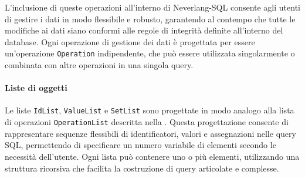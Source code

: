 \documentclass[12pt,a4paper,openright,twoside]{book}
\begin{document}
L’inclusione di queste operazioni all’interno di Neverlang-SQL consente agli utenti di gestire i dati in modo flessibile e robusto, 
garantendo al contempo che tutte le modifiche ai dati siano conformi alle regole di integrità definite all’interno del database. 
Ogni operazione di gestione dei dati è progettata per essere un’operazione \texttt{Operation} indipendente, che può essere 
utilizzata singolarmente o combinata con altre operazioni in una singola query.

\paragraph{Liste di oggetti}
Le liste \texttt{IdList}, \texttt{ValueList} e \texttt{SetList} sono progettate in modo analogo alla lista di operazioni 
\texttt{OperationList} descritta nella . Questa progettazione consente di rappresentare sequenze 
flessibili di identificatori, valori e assegnazioni nelle query SQL, permettendo di specificare un numero variabile di elementi 
secondo le necessità dell’utente. Ogni lista può contenere uno o più elementi, utilizzando una struttura ricorsiva che facilita la 
costruzione di query articolate e complesse.
\end{document}
